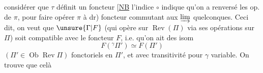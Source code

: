 considérer que  $\tau$ définit  un foncteur
[\uline{NB} l'indice $\circ$ indique qu'on a renversé les op. de $\pi$, pour faire opérer $\pi$ à dr)
foncteur commutant aux $\varinjlim$ quelconques. Ceci dit, on veut que $\unsure{\Gamma|F}$ (qui opère sur $\operatorname{Rev}(\Pi)$ via ses opérations sur $\Pi$) soit compatible avec le foncteur $F$, i.e. qu'on ait des isom
\[
F({}^{\gamma}\Pi')\simeq F(\Pi')
\]
$(\Pi'\in\operatorname{Ob}\operatorname{Rev}\Pi)$ fonctoriels en $\Pi'$, et avec transitivité pour $\gamma$ variable. On trouve que celà 
